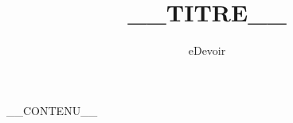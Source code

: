 \documentclass[a4paper,10pt]{article}
\title{__TITRE__}
\author{eDevoir}
\begin{document}
\maketitle

__CONTENU__
\end{document}
